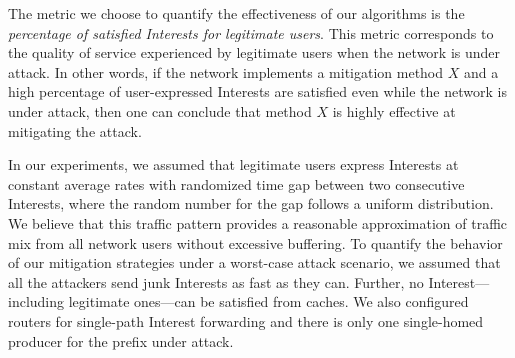 \documentclass[10pt,conference]{IEEEtran}
\begin{document}
{The metric we choose to quantify the effectiveness of our algorithms is the {\it percentage of satisfied Interests for legitimate users}. This metric corresponds to the quality of service experienced by legitimate users when the network is under attack. In other words, if the network implements a mitigation method $X$ and a high percentage of user-expressed Interests are satisfied even while the network is under attack, then one can conclude that method $X$ is highly effective at mitigating the attack.%
 

In our experiments, we assumed that legitimate users express Interests at constant average rates with randomized time gap between two consecutive Interests, where the random number for the gap follows a uniform distribution. We believe that this traffic pattern provides a reasonable approximation of traffic mix from all network users without excessive buffering. To quantify the behavior of our mitigation strategies under a worst-case attack scenario, we assumed that all the attackers send junk Interests as fast as they can. Further, no Interest---including legitimate ones---can be satisfied from caches.  We also configured routers for single-path Interest forwarding and there is only one single-homed producer for the prefix under attack.



}
\end{document}
